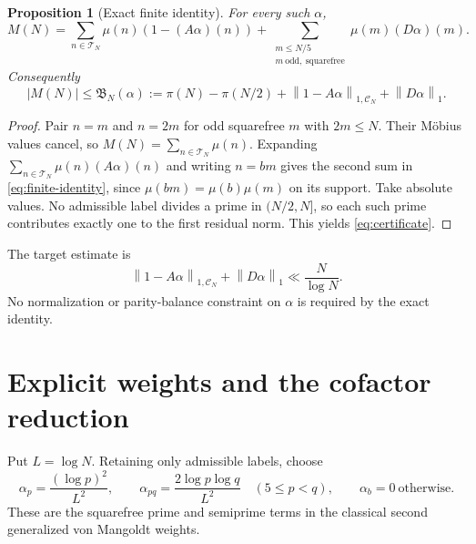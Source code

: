 \documentclass[11pt,letterpaper]{article}
\numberwithin{equation}{section}
\newtheorem{proposition}[theorem]{Proposition}
\theoremstyle{definition}
\theoremstyle{remark}
\newcommand{\norm}[1]{\left\lVert#1\right\rVert}
\begin{document}
\begin{proposition}[Exact finite identity]\label{prop:certificate}
For every such $\alpha$,
\begin{equation}\label{eq:finite-identity}
 M(N)=\sum_{n\in\mathcal T_N}\mu(n)(1-(A\alpha)(n))
       +\sum_{\substack{m\le N/5\\m\ \mathrm{odd,\ squarefree}}}
                   \mu(m)(D\alpha)(m).
\end{equation}
Consequently
\begin{equation}\label{eq:certificate}
 |M(N)|\le \mathfrak B_N(\alpha):=
   \pi(N)-\pi(N/2)+\norm{1-A\alpha}_{1,\mathcal C_N}
                      +\norm{D\alpha}_1.
\end{equation}
\end{proposition}
\begin{proof}
Pair $n=m$ and $n=2m$ for odd squarefree $m$ with $2m\le N$.
Their M\"obius values cancel, so
$M(N)=\sum_{n\in\mathcal T_N}\mu(n)$.
Expanding $\sum_{n\in\mathcal T_N}\mu(n)(A\alpha)(n)$ and writing $n=bm$
gives the second sum in \eqref{eq:finite-identity}, since
$\mu(bm)=\mu(b)\mu(m)$ on its support.
Take absolute values. No admissible label divides a prime in $(N/2,N]$,
so each such prime contributes exactly one to the first residual norm.
This yields \eqref{eq:certificate}.
\end{proof}

The target estimate is
\begin{equation}\label{eq:target-six}
 \norm{1-A\alpha}_{1,\mathcal C_N}+\norm{D\alpha}_1
       \ll \frac{N}{\log N}.
\end{equation}
No normalization or parity-balance constraint on $\alpha$ is required
by the exact identity.

\section{Explicit weights and the cofactor reduction}\label{sec:weights}

Put $L=\log N$. Retaining only admissible labels, choose
\begin{equation}\label{eq:weights}
 \alpha_p=\frac{(\log p)^2}{L^2},\qquad
 \alpha_{pq}=\frac{2\log p\log q}{L^2}\quad(5\le p<q),\qquad
 \alpha_b=0\ \text{otherwise}.
\end{equation}
These are the squarefree prime and semiprime terms in the classical second
generalized von Mangoldt weights.
\end{document}
